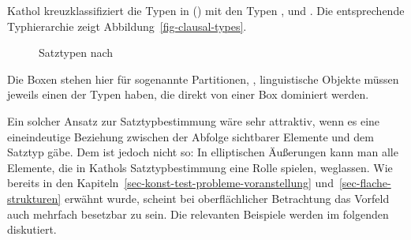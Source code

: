 Kathol kreuzklassifiziert die Typen in () mit den Typen ,  und
. Die entsprechende Typhierarchie zeigt Abbildung~\vref{fig-clausal-types}.
%
\begin{figure}[htbp]
\caption{\label{fig-clausal-types}Satztypen nach }
\end{figure}
Die Boxen stehen hier für sogenannte Partitionen, \dash, linguistische Objekte müssen
jeweils einen der Typen haben, die direkt von einer Box dominiert werden.

Ein solcher Ansatz zur Satztypbestimmung wäre sehr attraktiv, wenn es eine eineindeutige Beziehung
zwischen der Abfolge sichtbarer Elemente und dem Satztyp gäbe. Dem ist jedoch nicht so: In elliptischen
Äußerungen kann man alle Elemente, die in Kathols Satztypbestimmung eine Rolle spielen, weglassen.
Wie bereits in den Kapiteln~\ref{sec-konst-test-probleme-voranstellung}
und~\ref{sec-flache-strukturen} erwähnt wurde, scheint bei oberflächlicher Betrachtung 
das Vorfeld auch mehrfach besetzbar zu sein. Die relevanten Beispiele werden im folgenden diskutiert.

